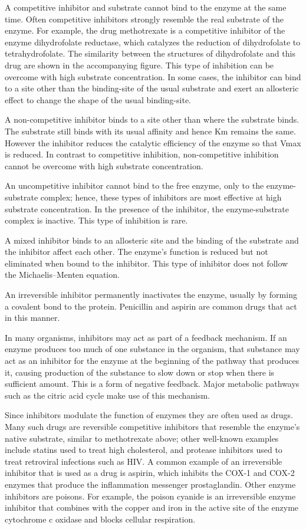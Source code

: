 A competitive inhibitor and substrate cannot bind to the enzyme at the same time. Often competitive inhibitors strongly resemble the real substrate of the enzyme. For example, the drug methotrexate is a competitive inhibitor of the enzyme dihydrofolate reductase, which catalyzes the reduction of dihydrofolate to tetrahydrofolate. The similarity between the structures of dihydrofolate and this drug are shown in the accompanying figure. This type of inhibition can be overcome with high substrate concentration. In some cases, the inhibitor can bind to a site other than the binding-site of the usual substrate and exert an allosteric effect to change the shape of the usual binding-site.

A non-competitive inhibitor binds to a site other than where the substrate binds. The substrate still binds with its usual affinity and hence Km remains the same. However the inhibitor reduces the catalytic efficiency of the enzyme so that Vmax is reduced. In contrast to competitive inhibition, non-competitive inhibition cannot be overcome with high substrate concentration.

An uncompetitive inhibitor cannot bind to the free enzyme, only to the enzyme-substrate complex; hence, these types of inhibitors are most effective at high substrate concentration. In the presence of the inhibitor, the enzyme-substrate complex is inactive. This type of inhibition is rare.

A mixed inhibitor binds to an allosteric site and the binding of the substrate and the inhibitor affect each other. The enzyme's function is reduced but not eliminated when bound to the inhibitor. This type of inhibitor does not follow the Michaelis--Menten equation.

An irreversible inhibitor permanently inactivates the enzyme, usually by forming a covalent bond to the protein. Penicillin and aspirin are common drugs that act in this manner.

In many organisms, inhibitors may act as part of a feedback mechanism. If an enzyme produces too much of one substance in the organism, that substance may act as an inhibitor for the enzyme at the beginning of the pathway that produces it, causing production of the substance to slow down or stop when there is sufficient amount. This is a form of negative feedback. Major metabolic pathways such as the citric acid cycle make use of this mechanism.

Since inhibitors modulate the function of enzymes they are often used as drugs. Many such drugs are reversible competitive inhibitors that resemble the enzyme's native substrate, similar to methotrexate above; other well-known examples include statins used to treat high cholesterol, and protease inhibitors used to treat retroviral infections such as HIV. A common example of an irreversible inhibitor that is used as a drug is aspirin, which inhibits the COX-1 and COX-2 enzymes that produce the inflammation messenger prostaglandin. Other enzyme inhibitors are poisons. For example, the poison cyanide is an irreversible enzyme inhibitor that combines with the copper and iron in the active site of the enzyme cytochrome c oxidase and blocks cellular respiration.

